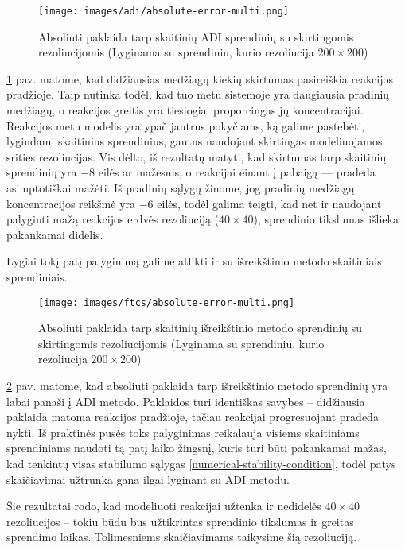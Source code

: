 \newpage

\begin{figure}[h!]
  \centering
  \texttt{[image: images/adi/absolute-error-multi.png]}
  \caption{Absoliuti paklaida tarp skaitinių ADI sprendinių su skirtingomis rezoliucijomis (Lyginama su sprendiniu, kurio rezoliucija $200\times200$)}
  \label{fig:adi-numerical-solution-absolute-error}
\end{figure}
\ref{fig:adi-numerical-solution-absolute-error} pav. matome, kad didžiausias medžiagų kiekių skirtumas pasireiškia reakcijos pradžioje. Taip nutinka todėl, kad tuo metu sistemoje yra daugiausia pradinių medžiagų, o reakcijos greitis yra tiesiogiai proporcingas jų koncentracijai. Reakcijos metu modelis yra ypač jautrus pokyčiams, ką galime pastebėti, lygindami skaitinius sprendinius, gautus naudojant skirtingas modeliuojamos srities rezoliucijas. Vis dėlto, iš rezultatų matyti, kad skirtumas tarp skaitinių sprendinių yra $-8$ eilės ar mažesnis, o reakcijai einant į pabaigą — pradeda asimptotiškai mažėti. Iš pradinių sąlygų žinome, jog pradinių medžiagų koncentracijos reikšmė yra $-6$ eilės, todėl galima teigti, kad net ir naudojant palyginti mažą reakcijos erdvės rezoliuciją ($40\times40$), sprendinio tikslumas išlieka pakankamai didelis. 

Lygiai tokį patį palyginimą galime atlikti ir su išreikštinio metodo skaitiniais sprendiniais.

\begin{figure}[htb!]
  \centering
  \texttt{[image: images/ftcs/absolute-error-multi.png]}
  \caption{Absoliuti paklaida tarp skaitinių išreikštinio metodo sprendinių su skirtingomis rezoliucijomis (Lyginama su sprendiniu, kurio rezoliucija $200\times200$)}
  \label{fig:ftcs-numerical-solution-absolute-error}
\end{figure}

\ref{fig:ftcs-numerical-solution-absolute-error} pav. matome, kad absoliuti paklaida tarp išreikštinio metodo sprendinių yra labai panaši į ADI metodo. Paklaidos turi identiškas savybes -- didžiausia paklaida matoma reakcijos pradžioje, tačiau reakcijai progresuojant pradeda nykti. Iš praktinės pusės toks palyginimas reikalauja visiems skaitiniams sprendiniams naudoti tą patį laiko žingsnį, kuris turi būti pakankamai mažas, kad tenkintų visas stabilumo sąlygas \eqref{numerical-stability-condition}, todėl patys skaičiavimai užtrunka gana ilgai lyginant su ADI metodu.

Šie rezultatai rodo, kad modeliuoti reakcijai užtenka ir nedidelės $40\times 40$ rezoliucijos -- tokiu būdu bus užtikrintas sprendinio tikslumas ir greitas sprendimo laikas. Tolimesniems skaičiavimams taikysime šią rezoliuciją.